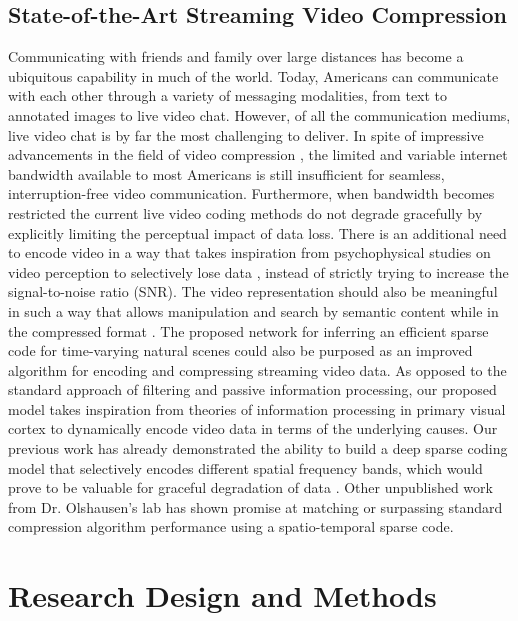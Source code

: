 \documentclass[smallextended]{svjour3}       %
\begin{document}
\subsection{State-of-the-Art Streaming Video Compression}
\noindent Communicating with friends and family over large distances has become a ubiquitous capability in much of the world. Today, Americans can communicate with each other through a variety of messaging modalities, from text to annotated images to live video chat. However, of all the communication mediums, live video chat is by far the most challenging to deliver. In spite of impressive advancements in the field of video compression \cite{shan2005cross,sullivan2005video,ohm2012comparison}, the limited and variable internet bandwidth available to most Americans is still insufficient for seamless, interruption-free video communication. Furthermore, when bandwidth becomes restricted the current live video coding methods do not degrade gracefully by explicitly limiting the perceptual impact of data loss. There is an additional need to encode video in a way that takes inspiration from psychophysical studies on video perception to selectively lose data \cite{lee2012perceptual,takeuchi2002motion,takeuchi2005sharpening}, instead of strictly trying to increase the signal-to-noise ratio (SNR). The video representation should also be meaningful in such a way that allows manipulation and search by semantic content while in the compressed format \cite{porikli2010compressed,kapotas2010moving}. The proposed network for inferring an efficient sparse code for time-varying natural scenes could also be purposed as an improved algorithm for encoding and compressing streaming video data. As opposed to the standard approach of filtering and passive information processing, our proposed model takes inspiration from theories of information processing in primary visual cortex to dynamically encode video data in terms of the underlying causes. Our previous work has already demonstrated the ability to build a deep sparse coding model that selectively encodes different spatial frequency bands, which would prove to be valuable for graceful degradation of data \cite{paiton2015deconvolutional}. Other unpublished work from Dr. Olshausen's lab has shown promise at matching or surpassing standard compression algorithm performance using a spatio-temporal sparse code.

\section{Research Design and Methods} \label{methods}
\end{document}
